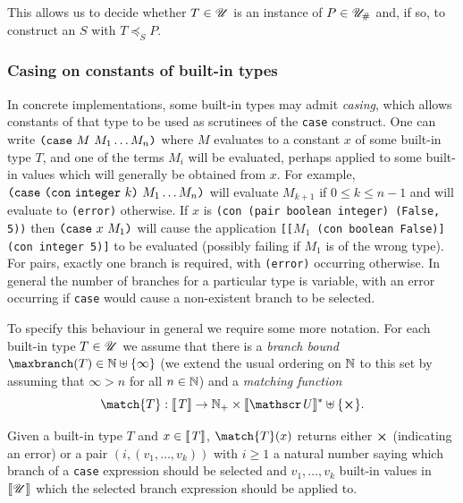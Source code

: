 \noindent This allows us to decide whether $T \in \mathscr{U}$ is an instance of $P \in
{\mathscr{U}_{\#}}$ and, if so, to construct an $S$ with $T \preceq_S P$.


\subsubsection{Casing on constants of built-in types}
\label{sec:builtin-casing}
In concrete implementations, some built-in types may admit \textit{casing},
which allows constants of that type to be used as scrutinees of the
\texttt{case} construct.  One can write $\texttt{(} \texttt{case} ~ M ~ M_1 \ldots M_n \texttt{)}$ where $M$
evaluates to a constant $x$ of some built-in type $T$, and one of the terms $M_i$
will be evaluated, perhaps applied to some built-in values which will generally
be obtained from $x$.  For example, $\texttt{(} \texttt{case} ~ \texttt{(} \texttt{con} ~ \mathtt{integer} ~ k \texttt{)} ~ M_1 \ldots
  M_n \texttt{)}$ will evaluate $M_{k+1}$ if $0 \leq k \leq n-1$ and will evaluate to
\texttt{(error)} otherwise.  If $x$ is \texttt{(con (pair boolean integer)
  (False, 5))} then $\texttt{(} \texttt{case} ~ x ~ M_1 \texttt{)}$ will cause the application \texttt{[[$M_1$
      (con boolean False)] (con integer 5)]} to be evaluated (possibly failing
if $M_1$ is of the wrong type).  For pairs, exactly one branch is required, with
\texttt{(error)} occurring otherwise.  In general the number of branches for a
particular type is variable, with an error occurring if \texttt{case} would
cause a non-existent branch to be selected.

\medskip
To specify this behaviour in general we require some more notation.  For each
built-in type $T \in \mathscr{U}$ we assume that there is a \textit{branch bound}
$\maxbranch(T) \in \N \disj \{\infty\}$ (we extend the usual ordering on $\mathbb{N}$ to
this set by assuming that $\infty > n$ for all $n \in \mathbb{N}$) and a \textit{matching
  function}
$$
\match{T}: \denote{T} \rightarrow \Nplus \times \denote{\Uni}^* \disj \{\errorX\}.
$$

\noindent
Given a built-in type $T$ and $x \in \llbracket\mathit{T}\rrbracket$, $\match{T}(x)$ returns either
$\errorX$ (indicating an error) or a pair $(i, (v_1, \ldots, v_k))$ with $i \geq
1$ a natural number saying which branch of a \texttt{case} expression should be
selected and $v_1, \ldots, v_k$ built-in values in $\llbracket\mathit{\mathscr{U}}\rrbracket$ which the
selected branch expression should be applied to.

